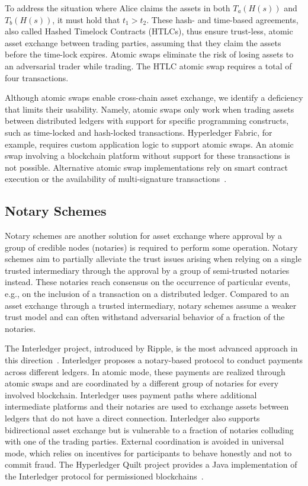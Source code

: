 To address the situation where Alice claims the assets in both $ T_a(H(s)) $ and $ T_b(H(s)) $, it must hold that $ t_1 > t_2 $.
These hash- and time-based agreements, also called Hashed Timelock Contracts (HTLCs), thus ensure trust-less, atomic asset exchange between trading parties, assuming that they claim the assets before the time-lock expires.
Atomic swaps eliminate the risk of losing assets to an adversarial trader while trading.
The HTLC atomic swap requires a total of four transactions.

Although atomic swaps enable cross-chain asset exchange, we identify a deficiency that limits their usability.
Namely, atomic swaps only work when trading assets between distributed ledgers with support for specific programming constructs, such as time-locked and hash-locked transactions.
Hyperledger Fabric, for example, requires custom application logic to support atomic swaps.
An atomic swap involving a blockchain platform without support for these transactions is not possible.
Alternative atomic swap implementations rely on smart contract execution or the availability of multi-signature transactions~\cite{zie2019extending}.

\subsection{Notary Schemes}
\label{sec:notary_schemes}
Notary schemes are another solution for asset exchange where approval by a group of credible nodes (notaries) is required to perform some operation.
Notary schemes aim to partially alleviate the trust issues arising when relying on a single trusted intermediary through the approval by a group of semi-trusted notaries instead.
These notaries reach consensus on the occurrence of particular events, e.g., on the inclusion of a transaction on a distributed ledger.
Compared to an asset exchange through a trusted intermediary, notary schemes assume a weaker trust model and can often withstand adversarial behavior of a fraction of the notaries.

The Interledger project, introduced by Ripple, is the most advanced approach in this direction~\cite{thomas2015protocol}.
Interledger proposes a notary-based protocol to conduct payments across different ledgers.
In atomic mode, these payments are realized through atomic swaps and are coordinated by a different group of notaries for every involved blockchain.
Interledger uses payment paths where additional intermediate platforms and their notaries are used to exchange assets between ledgers that do not have a direct connection.
Interledger also supports bidirectional asset exchange but is vulnerable to a fraction of notaries colluding with one of the trading parties.
External coordination is avoided in universal mode, which relies on incentives for participants to behave honestly and not to commit fraud.
The Hyperledger Quilt project provides a Java implementation of the Interledger protocol for permissioned blockchains~\cite{hyperledgerquilt}.

